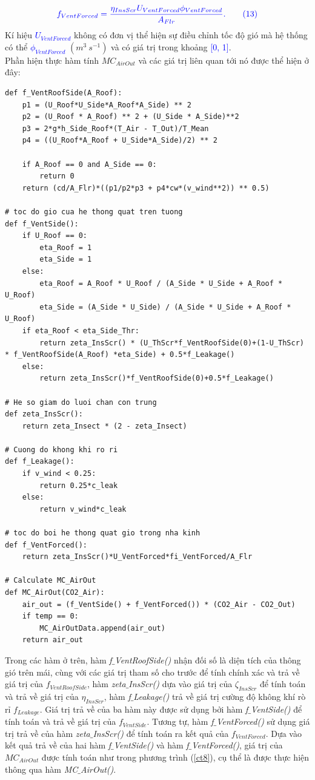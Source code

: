 \documentclass[13pt,a4paper]{article}
\begin{document}
			\begin{align}
				\color{blue}
					f_{VentForced} = \frac{\eta_{InsScr}U_{VentForced}\phi_{VentForced}}{A_{Flr}}.
				\color{blue}
				\tag{13} \label{ct13}
			\end{align}
			Kí hiệu \textcolor{blue}{$U_{VentForced}$} không có đơn vị thể hiện sự điều chỉnh tốc độ gió mà hệ thống có thể	\textcolor{blue}{$\phi_{VentForced}$} $(m^3\ s^{-1})$ và có giá trị trong khoảng \textcolor{blue}{[0, 1]}. \\
			Phần hiện thực hàm tính $MC_{AirOut}$ và các giá trị liên quan tới nó được thể hiện ở đây:
\begin{lstlisting}
def f_VentRoofSide(A_Roof):
	p1 = (U_Roof*U_Side*A_Roof*A_Side) ** 2
	p2 = (U_Roof * A_Roof) ** 2 + (U_Side * A_Side)**2
	p3 = 2*g*h_Side_Roof*(T_Air - T_Out)/T_Mean
	p4 = ((U_Roof*A_Roof + U_Side*A_Side)/2) ** 2
	
	if A_Roof == 0 and A_Side == 0:
		return 0
	return (cd/A_Flr)*((p1/p2*p3 + p4*cw*(v_wind**2)) ** 0.5)

# toc do gio cua he thong quat tren tuong
def f_VentSide():
    if U_Roof == 0:
		eta_Roof = 1
		eta_Side = 1
	else:
		eta_Roof = A_Roof * U_Roof / (A_Side * U_Side + A_Roof * U_Roof)
		eta_Side = (A_Side * U_Side) / (A_Side * U_Side + A_Roof * U_Roof)
	if eta_Roof < eta_Side_Thr:
		return zeta_InsScr() * (U_ThScr*f_VentRoofSide(0)+(1-U_ThScr) * f_VentRoofSide(A_Roof) *eta_Side) + 0.5*f_Leakage()
	else:
		return zeta_InsScr()*f_VentRoofSide(0)+0.5*f_Leakage()

# He so giam do luoi chan con trung
def zeta_InsScr():
	return zeta_Insect * (2 - zeta_Insect)

# Cuong do khong khi ro ri
def f_Leakage():
	if v_wind < 0.25:
		return 0.25*c_leak
	else:
		return v_wind*c_leak

# toc do boi he thong quat gio trong nha kinh
def f_VentForced():
	return zeta_InsScr()*U_VentForced*fi_VentForced/A_Flr

# Calculate MC_AirOut
def MC_AirOut(CO2_Air):
	air_out = (f_VentSide() + f_VentForced()) * (CO2_Air - CO2_Out)
	if temp == 0:
		MC_AirOutData.append(air_out)
	return air_out
\end{lstlisting}
			Trong các hàm ở trên, hàm  \textit{f$\_$VentRoofSide()} nhận đối số là diện tích của thông gió trên mái, cùng với các giá trị tham số cho trước để tính chính xác và trả về giá trị của $f_{VentRoofSide}$, hàm \textit{zeta$\_$InsScr()} dựa vào giá trị của $\zeta_{InsScr}$ để tính toán và trả về giá trị của $\eta_{InsScr}$, hàm \textit{f$\_$Leakage()} trả về giá trị cường độ không khí rò rỉ $f_{Leakage}$. Giá trị trả về của ba hàm này được sử dụng bởi hàm \textit{f$\_$VentSide()} để tính toán và trả về giá trị của $f_{VentSide}$. Tương tự,  hàm \textit{f$\_$VentForced()} sử dụng giá trị trả về của hàm \textit{zeta$\_$InsScr()} để tính toán ra kết quả của $f_{VentForced}$. Dựa vào kết quả trả về của hai hàm \textit{f$\_$VentSide()} và hàm \textit{f$\_$VentForced()}, giá trị của $MC_{AirOut}$ được tính toán như trong phương trình (\ref{ct8}), cụ thể là được thực hiện thông qua hàm \textit{MC$\_$AirOut()}.\\ \\
			
\end{document}
